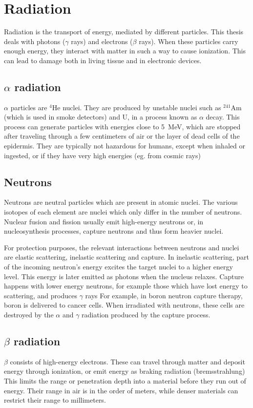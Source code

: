 \section{Radiation}
\label{sec:radiacion}
Radiation is the transport of energy, mediated by different particles.
This thesis deals with photons ($\gamma$ rays) and electrons ($\beta$ rays).
When these particles carry enough energy,
they interact with matter in such a way to cause ionization.
This can lead to damage both in living tissue and in electronic devices.
%
\subsection{$\alpha$ radiation}
$\alpha$ particles are $^4$He nuclei.
They are produced by unstable nuclei such as
$^{241}$Am (which is used in smoke detectors) and U,
in a process known as $\alpha$ decay.
This process can generate particles with energies close to
\SI{5}{\mega\electronvolt},
which are stopped after traveling through a few centimeters of air
or the layer of dead cells of the epidermis.
They are typically not hazardous for humans,
except when inhaled or ingested,
or if they have very high energies (eg. from cosmic rays)
\subsection{Neutrons}
Neutrons are neutral particles which are present in atomic nuclei.
The various isotopes of each element are nuclei which only differ in the number of neutrons.
Nuclear fusion and fission usually emit high-energy neutrons or,
in nucleosynthesis processes,
capture neutrons and thus form heavier nuclei.

For protection purposes, the relevant interactions between neutrons and nuclei
are elastic scattering, inelastic scattering and capture.
In inelastic scattering,
part of the incoming neutron's energy excites the target nuclei to a higher energy level.
This energy is later emitted as photons when the nucleus relaxes.
Capture happens with lower energy neutrons,
for example those which have lost energy to scattering,
and produces $\gamma$ rays
For example, in boron neutron capture therapy,
boron is delivered to cancer cells.
When irradiated with neutrons, these cells are destroyed
by the $\alpha$ and $\gamma$ radiation produced by the capture process.
\subsection{$\beta$ radiation}
$\beta$ consists of high-energy electrons.
These can travel through matter and deposit energy through ionization,
or emit energy as braking radiation (bremsstrahlung)
This limits the range or penetration depth into a material before they run out of energy.
Their range in air is in the order of meters,
while denser materials can restrict their range to millimeters.

